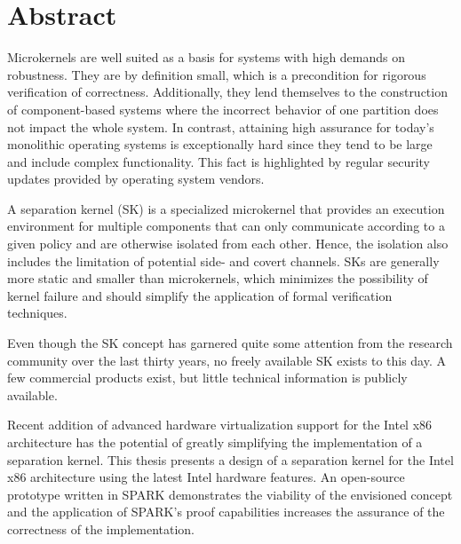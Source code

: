 \chapter*{Abstract}
Microkernels are well suited as a basis for systems with high demands on
robustness. They are by definition small, which is a precondition for rigorous
verification of correctness. Additionally, they lend themselves to the
construction of component-based systems where the incorrect behavior of one
partition does not impact the whole system. In contrast, attaining high
assurance for today's monolithic operating systems is exceptionally hard since
they tend to be large and include complex functionality. This fact is
highlighted by regular security updates provided by operating system vendors.

A separation kernel (SK) is a specialized microkernel that provides an execution
environment for multiple components that can only communicate according to a
given policy and are otherwise isolated from each other. Hence, the isolation
also includes the limitation of potential side- and covert channels. SKs are
generally more static and smaller than microkernels, which minimizes the
possibility of kernel failure and should simplify the application of formal
verification techniques.

Even though the SK concept has garnered quite some attention from the research
community over the last thirty years, no freely available SK exists to this
day. A few commercial products exist, but little technical information is
publicly available.

Recent addition of advanced hardware virtualization support for the Intel x86
architecture has the potential of greatly simplifying the implementation of a
separation kernel. This thesis presents a design of a separation kernel for the
Intel x86 architecture using the latest Intel hardware features. An open-source
prototype written in SPARK demonstrates the viability of the envisioned
concept and the application of SPARK's proof capabilities increases the
assurance of the correctness of the implementation.
